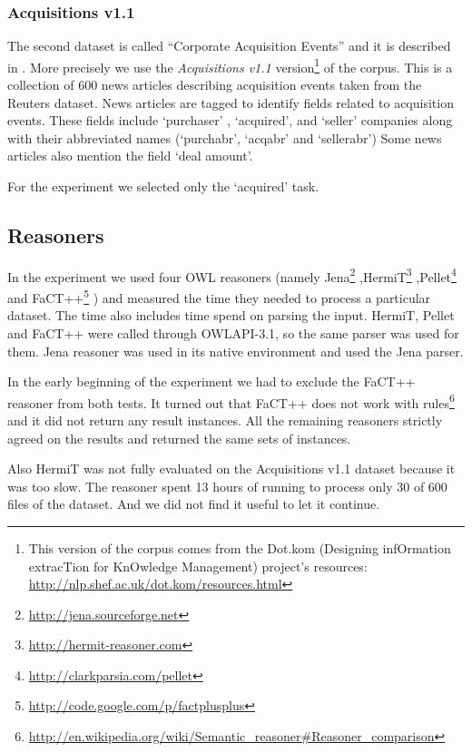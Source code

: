 \subsubsection{Acquisitions v1.1}  

The second dataset is called ``Corporate Acquisition Events'' and it is
described in \citep{lewis1992representation}. More precisely we use the \emph{Acquisitions v1.1} version\footnote{This version of the corpus comes from the Dot.kom (Designing infOrmation extracTion for KnOwledge Management) project's resources: \url{http://nlp.shef.ac.uk/dot.kom/resources.html}} of the corpus.
This is a collection of 600 news articles describing acquisition
events taken from the Reuters dataset. News articles are tagged to identify fields
related to acquisition events. These fields include `purchaser' , `acquired', and
`seller' companies along with their abbreviated names (`purchabr', `acqabr' and
`sellerabr') Some news articles also mention the field `deal amount'.


For the experiment we selected only the `acquired' task.





\subsection{Reasoners}

In the experiment we used four OWL reasoners (namely
Jena\footnote{\url{http://jena.sourceforge.net}}
,HermiT\footnote{\url{http://hermit-reasoner.com}}
,Pellet\footnote{\url{http://clarkparsia.com/pellet}}
and FaCT++\footnote{\url{http://code.google.com/p/factplusplus}}
) and measured the time they needed to process a particular dataset. The time also includes time spend on parsing the input. HermiT, Pellet and FaCT++ were called through OWLAPI-3.1, so the same parser was used for them. Jena reasoner was used in its native environment and used the Jena parser.

In the early beginning of the experiment we had to exclude the FaCT++ reasoner from both tests. It turned out that FaCT++ does not work with rules\footnote{\url{http://en.wikipedia.org/wiki/Semantic_reasoner#Reasoner_comparison}} and it did not return any result instances.  All the remaining reasoners strictly agreed on the results and returned the same sets of instances.

Also HermiT was not fully evaluated on the Acquisitions v1.1 dataset because it was too slow. The reasoner spent 13 hours of running to process only 30 of 600 files of the dataset. And we did not find it useful to let it continue.












